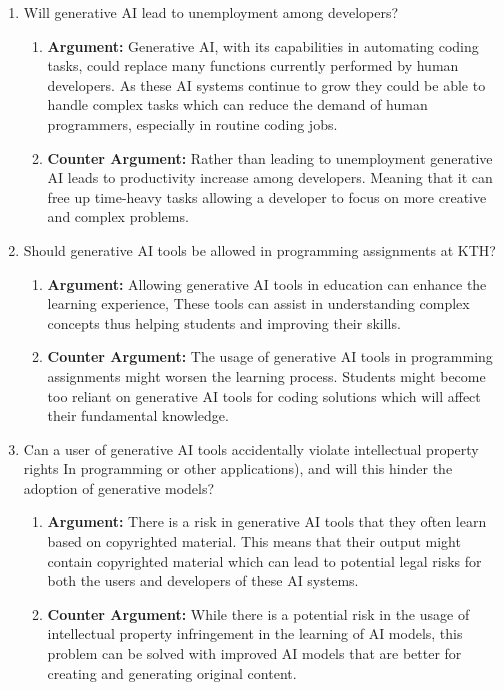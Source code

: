 \documentclass{article}
\begin{document}
\begin{enumerate}
    \item Will generative AI lead to unemployment among developers?
    \begin{enumerate}
        \item \textbf{Argument:} Generative AI, with its capabilities in automating coding tasks, could replace many functions currently performed by human developers. As these AI systems continue to grow they could be able to handle complex tasks which can reduce the demand of human programmers, especially in routine coding jobs.
        \item \textbf{Counter Argument:} Rather than leading to unemployment generative AI leads to productivity increase among developers. Meaning that it can free up time-heavy tasks allowing a developer to focus on more creative and complex problems.
    \end{enumerate}
    \item Should generative AI tools be allowed in programming assignments at KTH?
     \begin{enumerate}
        \item \textbf{Argument:} Allowing generative AI tools in education can enhance the learning experience, These tools can assist in understanding complex concepts thus helping students and improving their skills.
        \item \textbf{Counter Argument:} The usage of generative AI tools in programming assignments might worsen the learning process. Students might become too reliant on generative AI tools for coding solutions which will affect their fundamental knowledge.
    \end{enumerate}
    \item Can a user of generative AI tools accidentally violate intellectual property rights In programming or other applications), and will this hinder the adoption of generative models?
     \begin{enumerate}
        \item \textbf{Argument:} There is a risk in generative AI tools that they often learn based on copyrighted material. This means that their output might contain copyrighted material which can lead to potential legal risks for both the users and developers of these AI systems.
        \item \textbf{Counter Argument:} While there is a potential risk in the usage of intellectual property infringement in the learning of AI models, this problem can be solved with improved AI models that are better for creating and generating original content.
    \end{enumerate}
\end{enumerate}


\hspace{0cm}
\newpage



\end{document}
